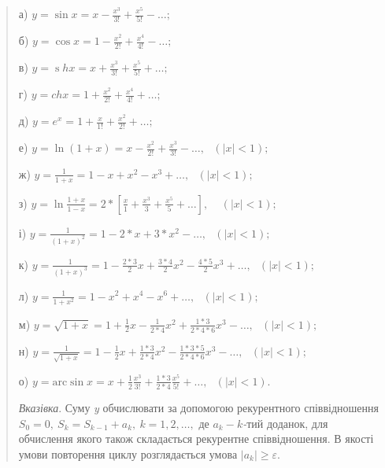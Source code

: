 \documentclass[]{article}
\begin{document}
\begin{quote}
а) \(y = \sin x = x - \frac{x^{3}}{3!} + \frac{x^{5}}{5!} - \ldots;\)

б) \(y = \cos x = 1 - \frac{x^{2}}{2!} + \frac{x^{4}}{4!} - \ldots;\)

в)
\(y = \operatorname{s}hx = x + \frac{x^{3}}{3!} + \frac{x^{5}}{5!} + \ldots;\)

г) \(y = chx = 1 + \frac{x^{2}}{2!} + \frac{x^{4}}{4!} + \ldots;\)

д) \(y = e^{x} = 1 + \frac{x}{1!} + \frac{x^{2}}{2!} + \ldots;\)

е)
\(y = \ln(1 + x) = x - \frac{x^{2}}{2!} + \frac{x^{3}}{3!} - \ldots,\mathrm{\text{\ \ \ \ \ }}(\left| x \right| < 1);\)

ж)
\(y = \frac{1}{1 + x} = 1 - x + x^{2} - x^{3} + \ldots,\mathrm{\text{\ \ \ \ \ }}(\left| x \right| < 1);\)

з)
\(y = \ln\frac{1 + x}{1 - x} = 2*\left\lbrack \frac{x}{1} + \frac{x^{3}}{3} + \frac{x^{5}}{5} + \ldots \right\rbrack\mathrm{,\ \ \ \ \ }(\left| x \right| < 1);\)

і)
\(y = \frac{1}{(1 + x)^{2}} = 1 - 2*x + 3*x^{2} - \ldots,\mathrm{\text{\ \ \ \ \ }}(\left| x \right| < 1);\)

к)
\(y = \frac{1}{(1 + x)^{3}} = 1 - \frac{2*3}{2}x + \frac{3*4}{2}x^{2} - \frac{4*5}{2}x^{3} + \ldots,\mathrm{\text{\ \ \ \ \ }}(\left| x \right| < 1);\)

л)
\(y = \frac{1}{1 + x^{2}} = 1 - x^{2} + x^{4} - x^{6} + \ldots,\mathrm{\text{\ \ \ \ \ }}(\left| x \right| < 1);\)

м)
\(y = \sqrt{1 + x} = 1 + \frac{1}{2}x - \frac{1}{2*4}x^{2} + \frac{1*3}{2*4*6}x^{3} - \ldots,\mathrm{\text{\ \ \ \ \ }}(\left| x \right| < 1);\)

н)
\(y = \frac{1}{\sqrt{1 + x}} = 1 - \frac{1}{2}x + \frac{1*3}{2*4}x^{2} - \frac{1*3*5}{2*4*6}x^{3} - \ldots,\mathrm{\text{\ \ \ \ \ }}(\left| x \right| < 1);\)

о)
\(y = \mathrm{\text{arc}}\sin x = x + \frac{1}{2}\frac{x^{3}}{3!} + \frac{1*3}{2*4}\frac{x^{5}}{5!} + \ldots,\mathrm{\text{\ \ \ \ \ \ \ }}(\left| x \right|\mathrm{< 1}).\)

\emph{\emph{Вказівка}}. Суму \emph{y} обчислювати за допомогою
рекурентного співвідношення
\(S_{0} = 0,\ S_{k} = S_{k - 1} + a_{k},\ k = 1,2,\ldots,\) де
\(a_{k} - k\)\emph{-}тий доданок, для обчислення якого також складається
рекурентне співвідношення. В якості умови повторення циклу розглядається
умова \(\left| a_{k} \right| \geq \varepsilon.\)
\end{quote}
\end{document}
